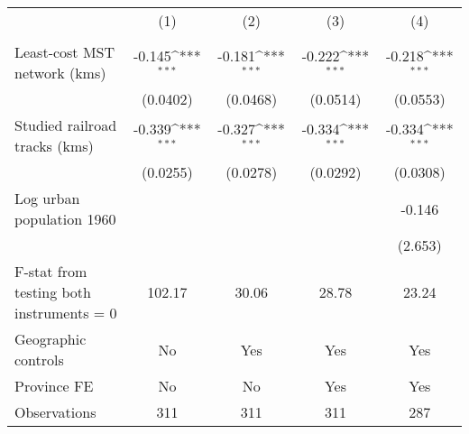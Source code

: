 {
\def\sym#1{\ifmmode^{#1}\else\(^{#1}\)\fi}
\begin{tabular}{l*{4}{c}}
\hline\hline
                &\multicolumn{1}{c}{(1)}&\multicolumn{1}{c}{(2)}&\multicolumn{1}{c}{(3)}&\multicolumn{1}{c}{(4)}\\
                &\multicolumn{1}{c}{}&\multicolumn{1}{c}{}&\multicolumn{1}{c}{}&\multicolumn{1}{c}{}\\
\hline
Least-cost MST network (kms)&   -0.145\sym{***}&   -0.181\sym{***}&   -0.222\sym{***}&   -0.218\sym{***}\\
                & (0.0402)         & (0.0468)         & (0.0514)         & (0.0553)         \\
[1em]
Studied railroad tracks (kms)&   -0.339\sym{***}&   -0.327\sym{***}&   -0.334\sym{***}&   -0.334\sym{***}\\
                & (0.0255)         & (0.0278)         & (0.0292)         & (0.0308)         \\
[1em]
Log urban population 1960&                  &                  &                  &   -0.146         \\
                &                  &                  &                  &  (2.653)         \\
\hline
F-stat from testing both instruments = 0&   102.17         &    30.06         &    28.78         &    23.24         \\
Geographic controls&       No         &      Yes         &      Yes         &      Yes         \\
Province FE     &       No         &       No         &      Yes         &      Yes         \\
Observations    &      311         &      311         &      311         &      287         \\
\hline\hline
\end{tabular}
}
